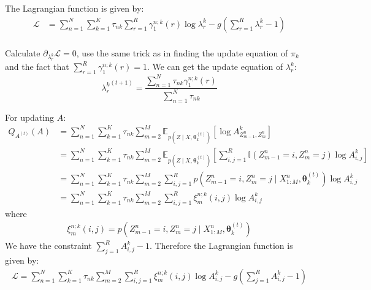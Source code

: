 \documentclass[12pt]{article}
\newenvironment{problem}[2][Problem]{\begin{trivlist}
\item[\hskip \labelsep {\bfseries #1}\hskip \labelsep {\bfseries #2.}]}{\end{trivlist}}
\begin{document}
\begin{problem}{2.7.21}
The Lagrangian function is given by:
\begin{align*}
    \mathcal{L} &= 
        \sum_{n=1}^{N} \sum_{k=1}^{K} \tau_{nk} \sum_{r=1}^{R} 
            \gamma^{n;k}_{1}(r) \log \lambda^k_{r} 
        - g(\sum_{r=1}^{R} \lambda_r^k - 1)\\
\end{align*}

Calculate $\partial_{\lambda^k_{r}}\mathcal{L} = 0$, 
use the same trick as in finding the update equation of $\pi_k$ and the fact that
$\sum_{r=1}^{R}\gamma^{n;k}_{1}(r) = 1$. We can get the update equation of 
$\lambda^k_{r}$:
\begin{equation}
    {\lambda^k_{r}}^{(t+1)} = \frac{\sum_{n=1}^{N}\tau_{nk} \gamma^{n;k}_{1}(r)}
                                   {\sum_{n=1}^{N}\tau_{nk}}
\end{equation}

For updating $A$:
\begin{align*}
    Q_{A^{(t)}}(A) &= \sum_{n=1}^{N} \sum_{k=1}^{K} \tau_{nk} \sum_{m=2}^{M} 
        \mathbb{E}_{p(Z\mid X, \bm{\theta}^{(t)}_k)}[\log A^k_{Z^n_{m-1},Z^n_m}] \\
    &= \sum_{n=1}^{N} \sum_{k=1}^{K} \tau_{nk} \sum_{m=2}^{M} 
        \mathbb{E}_{p(Z\mid X, \bm{\theta}^{(t)}_k)}
        [\sum_{i,j=1}^{R} \mathbb{I}(Z^n_{m-1} = i, Z^n_m = j) \log A^k_{i,j}] \\
    &= \sum_{n=1}^{N} \sum_{k=1}^{K} \tau_{nk} \sum_{m=2}^{M} 
        \sum_{i,j=1}^{R} p(Z^n_{m-1} = i, Z^n_m = j \mid X^n_{1:M}, \bm{\theta}^{(t)}_k) \log A^k_{i,j} \\
    &= \sum_{n=1}^{N} \sum_{k=1}^{K} \tau_{nk} \sum_{m=2}^{M} \sum_{i,j=1}^{R} \xi_{m}^{n;k}(i,j)\log A^k_{i,j}
\end{align*}
where
\begin{align*}
    \xi_{m}^{n;k}(i,j) = p(Z^n_{m-1} = i, Z^n_m = j \mid X^n_{1:M}, \bm{\theta}^{(t)}_k)
\end{align*}
We have the constraint $\sum_{j=1}^{R} A^k_{i,j} - 1$.
Therefore the Lagrangian function is given by:
\begin{align*}
    \mathcal{L} = 
        \sum_{n=1}^{N} \sum_{k=1}^{K} 
        \tau_{nk} \sum_{m=2}^{M} \sum_{i,j=1}^{R} \xi_{m}^{n;k}(i,j)\log A^k_{i,j}
        - g(\sum_{j=1}^{R} A^k_{i,j} - 1)
\end{align*}


\end{problem}
\end{document}
